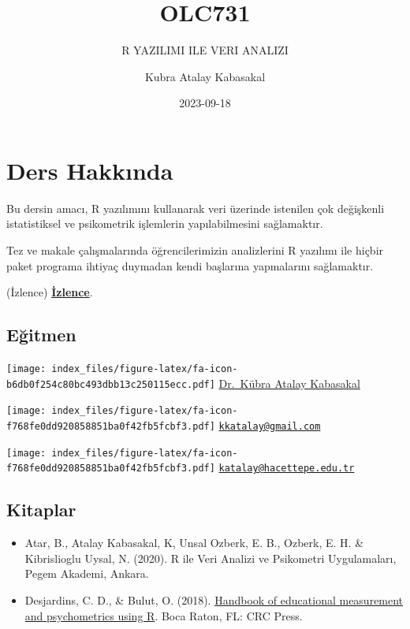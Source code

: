 \documentclass[
  oneside]{book}
\title{OLC731}
\subtitle{R YAZILIMI ILE VERI ANALIZI}
\author{Kubra Atalay Kabasakal}
\date{2023-09-18}
\begin{document}
\maketitle

{
\setcounter{tocdepth}{1}
\tableofcontents
}
\hypertarget{ders-hakkux131nda}{%
\chapter*{Ders Hakkında}\label{ders-hakkux131nda}}

Bu dersin amacı, R yazılımını kullanarak veri üzerinde istenilen çok değişkenli istatistiksel ve psikometrik işlemlerin yapılabilmesini sağlamaktır.

Tez ve makale çalışmalarında öğrencilerimizin analizlerini R yazılımı ile hiçbir paket programa ihtiyaç duymadan kendi başlarına yapmalarını sağlamaktır.

(İzlence) \href{https://akts.hacettepe.edu.tr/ders_detay.php?ders_ref=DRSTNM_0000000000000000000018497\&ders_kod=OLC731\&zs_link=2\&prg_kod=21134\&submenuheader=2}{\textbf{İzlence}}.

\hypertarget{eux11fitmen}{%
\section*{Eğitmen}\label{eux11fitmen}}

\texttt{[image: index\_files/figure-latex/fa-icon-b6db0f254c80bc493dbb13c250115ecc.pdf]} \href{https://avesis.hacettepe.edu.tr/katalay}{Dr.~Kübra Atalay Kabasakal}

\texttt{[image: index\_files/figure-latex/fa-icon-f768fe0dd920858851ba0f42fb5fcbf3.pdf]} \href{mailto:kkatalay@gmail.com}{\nolinkurl{kkatalay@gmail.com}}

\texttt{[image: index\_files/figure-latex/fa-icon-f768fe0dd920858851ba0f42fb5fcbf3.pdf]} \href{mailto:katalay@hacettepe.edu.tr}{\nolinkurl{katalay@hacettepe.edu.tr}}

\hypertarget{kitaplar}{%
\section*{Kitaplar}\label{kitaplar}}

\begin{itemize}
\item
  Atar, B., Atalay Kabasakal, K, Unsal Ozberk, E. B., Ozberk, E. H. \& Kibrislioglu Uysal, N. (2020). R ile Veri Analizi ve Psikometri Uygulamaları, Pegem Akademi, Ankara.
\item
  Desjardins, C. D., \& Bulut, O. (2018). \href{https://www.routledge.com/Handbook-of-Educational-Measurement-and-Psychometrics-Using-R/Desjardins-Bulut/p/book/9780367734671}{Handbook of educational measurement and psychometrics using R}. Boca Raton, FL: CRC Press.
\end{itemize}
\end{document}
